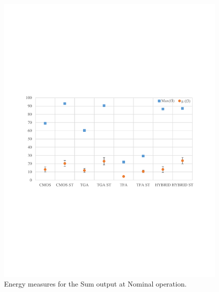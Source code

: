 \documentclass[ecp,tc, english]{iiufrgs}
\begin{document}
\begin{figure}[H]
\centering
\includegraphics[width=\textwidth, trim={0 9cm 0 9cm},clip]{energyNominalSum.pdf}
\caption{Energy measures for the Sum output at Nominal operation.}
\label{fig:energyNS}
\end{figure}
\end{document}
